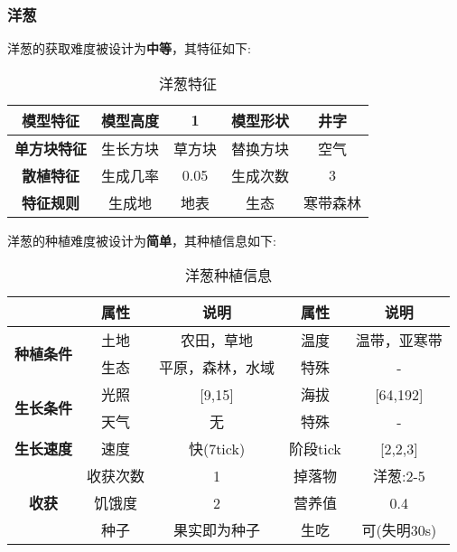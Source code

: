 \subsubsection{洋葱}

洋葱的获取难度被设计为\textbf{中等}，其特征如下:
\begin{table}[H]
    \centering
    \caption{洋葱特征}
    \label{table:洋葱特征}
    \setlength{\tabcolsep}{4mm}
    \begin{tabular}{c|cc|cc}
        \toprule
        \textbf{模型特征}   & 模型高度 & 1      & 模型形状 & 井字 \\
        \midrule
        \textbf{单方块特征} & 生长方块 & 草方块 & 替换方块 & 空气 \\
        \midrule
        \textbf{散植特征}   & 生成几率 & 0.05   & 生成次数 & 3    \\
        \midrule
        \textbf{特征规则}   & 生成地   & 地表   & 生态     & 寒带森林 \\
        \bottomrule
    \end{tabular}
\end{table}


洋葱的种植难度被设计为\textbf{简单}，其种植信息如下:

\begin{table}[H]
    \centering
    \caption{洋葱种植信息}
    \label{table:洋葱种植信息}
    \setlength{\tabcolsep}{4mm}
    \begin{tabular}{c|cc|cc}
        \toprule
                                           & \textbf{属性} & \textbf{说明}    & \textbf{属性} & \textbf{说明} \\
        \midrule
        \multirow{2}{*}{\textbf{种植条件}} & 土地          & 农田，草地       & 温度          & 温带，亚寒带    \\
                                           & 生态          & 平原，森林，水域 & 特殊          & -          \\
        \midrule
        \multirow{2}{*}{\textbf{生长条件}} & 光照          & [9,15]           & 海拔          & [64,192]      \\
                                           & 天气          & 无               & 特殊          & -             \\
        \midrule
        \textbf{生长速度}                  & 速度          & 快(7tick)     & 阶段tick      & [2,2,3]       \\
        \midrule
        \multirow{3}{*}{\textbf{收获}}     & 收获次数      & 1                & 掉落物        & 洋葱:2-5      \\
                                           & 饥饿度        & 2                & 营养值        & 0.4           \\
                                        & 种子 & 果实即为种子 & 生吃 & 可(失明30s) \\
        \bottomrule
    \end{tabular}
\end{table}

